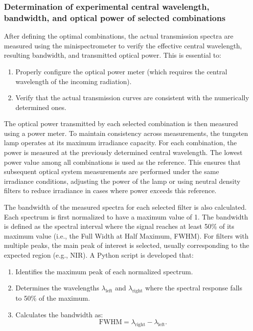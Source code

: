 \subsubsection{Determination of experimental central wavelength, bandwidth, and optical power of selected combinations}
\label{subsub:longitud_onda_central_potencia}

After defining the optimal combinations, the actual transmission spectra are measured using the minispectrometer to verify the effective central wavelength, resulting bandwidth, and transmitted optical power. This is essential to:

\begin{enumerate}
    \item Properly configure the optical power meter (which requires the central wavelength of the incoming radiation).
    \item Verify that the actual transmission curves are consistent with the numerically determined ones.
\end{enumerate}

\noindent The optical power transmitted by each selected combination is then measured using a power meter. To maintain consistency across measurements, the tungsten lamp operates at its maximum irradiance capacity. For each combination, the power is measured at the previously determined central wavelength. The lowest power value among all combinations is used as the reference. This ensures that subsequent optical system measurements are performed under the same irradiance conditions, adjusting the power of the lamp or using neutral density filters to reduce irradiance in cases where power exceeds this reference.\\

\medskip

\noindent The bandwidth of the measured spectra for each selected filter is also calculated. Each spectrum is first normalized to have a maximum value of 1. The bandwidth is defined as the spectral interval where the signal reaches at least 50\% of its maximum value (i.e., the Full Width at Half Maximum, FWHM). For filters with multiple peaks, the main peak of interest is selected, usually corresponding to the expected region (e.g., NIR). A Python script is developed that:

\begin{enumerate}
    \item Identifies the maximum peak of each normalized spectrum.
    \item Determines the wavelengths \(\lambda_{\text{left}}\) and \(\lambda_{\text{right}}\) where the spectral response falls to 50\% of the maximum.
    \item Calculates the bandwidth as:
    \[
    \text{FWHM} = \lambda_{\text{right}} - \lambda_{\text{left}}.
    \]
\end{enumerate}

